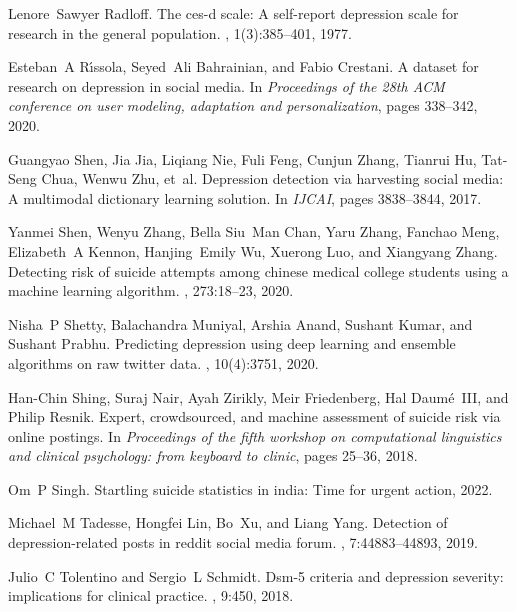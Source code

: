 \begin{thebibliography}{10}
Lenore~Sawyer Radloff.
\newblock The ces-d scale: A self-report depression scale for research in the
  general population.
, 1(3):385--401, 1977.

Esteban~A R{\'\i}ssola, Seyed~Ali Bahrainian, and Fabio Crestani.
\newblock A dataset for research on depression in social media.
\newblock In {\em Proceedings of the 28th ACM conference on user modeling,
  adaptation and personalization}, pages 338--342, 2020.

Guangyao Shen, Jia Jia, Liqiang Nie, Fuli Feng, Cunjun Zhang, Tianrui Hu,
  Tat-Seng Chua, Wenwu Zhu, et~al.
\newblock Depression detection via harvesting social media: A multimodal
  dictionary learning solution.
\newblock In {\em IJCAI}, pages 3838--3844, 2017.

Yanmei Shen, Wenyu Zhang, Bella Siu~Man Chan, Yaru Zhang, Fanchao Meng,
  Elizabeth~A Kennon, Hanjing~Emily Wu, Xuerong Luo, and Xiangyang Zhang.
\newblock Detecting risk of suicide attempts among chinese medical college
  students using a machine learning algorithm.
, 273:18--23, 2020.

Nisha~P Shetty, Balachandra Muniyal, Arshia Anand, Sushant Kumar, and Sushant
  Prabhu.
\newblock Predicting depression using deep learning and ensemble algorithms on
  raw twitter data.
,
  10(4):3751, 2020.

Han-Chin Shing, Suraj Nair, Ayah Zirikly, Meir Friedenberg, Hal Daum{\'e}~III,
  and Philip Resnik.
\newblock Expert, crowdsourced, and machine assessment of suicide risk via
  online postings.
\newblock In {\em Proceedings of the fifth workshop on computational
  linguistics and clinical psychology: from keyboard to clinic}, pages 25--36,
  2018.

Om~P Singh.
\newblock Startling suicide statistics in india: Time for urgent action, 2022.

Michael~M Tadesse, Hongfei Lin, Bo~Xu, and Liang Yang.
\newblock Detection of depression-related posts in reddit social media forum.
, 7:44883--44893, 2019.

Julio~C Tolentino and Sergio~L Schmidt.
\newblock Dsm-5 criteria and depression severity: implications for clinical
  practice.
, 9:450, 2018.


\end{thebibliography}
